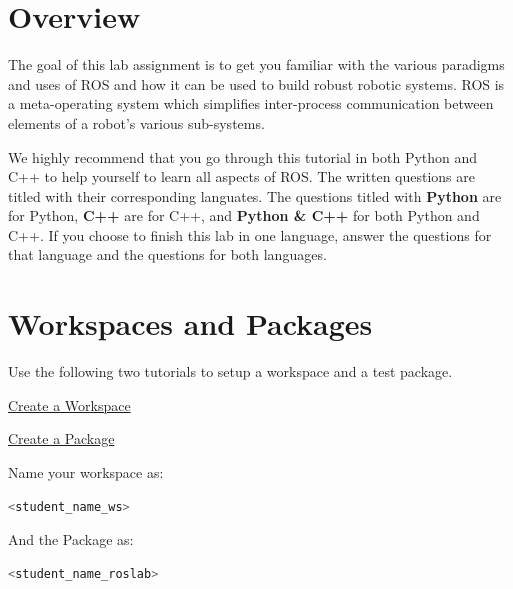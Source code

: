 \documentclass[letta4 paper]{article}
\numberwithin{equation}{section}
\newcommand{\0}{\mathbf{0}}
\begin{document}
	\section{Overview}
	The goal of this lab assignment is to get you familiar with the various paradigms and uses of ROS and how it can be used to build robust robotic systems. ROS is a meta-operating system which simplifies inter-process communication between elements of a robot's various sub-systems.
	
	We highly recommend that you go through this tutorial in both Python and C++ to help yourself to learn all aspects of ROS. The written questions are titled with their corresponding languates. The questions titled with \textbf{Python} are for Python, \textbf{C++} are for C++, and \textbf{Python \& C++} for both Python and C++. If you choose to finish this lab in one language, answer the questions for that language and the questions for both languages.

	\section{Workspaces and Packages}
	
	Use the following two tutorials to setup a workspace and a test package.
	
	\href{http://wiki.ros.org/catkin/Tutorials/create_a_workspace}{ Create a Workspace}
	
	\href{http://wiki.ros.org/ROS/Tutorials/CreatingPackage}{ Create a Package}
	
	\noindent Name your workspace as:
	
	\begin{lstlisting}[language=bash]
	<student_name_ws>
	\end{lstlisting}
	
	\noindent And the Package as:
	
	\begin{lstlisting}[language=bash]
	<student_name_roslab>
	\end{lstlisting}
	
\end{document}
